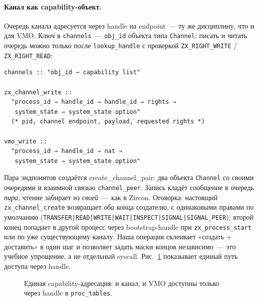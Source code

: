 \documentclass[11pt,a4paper]{article}
\newcommand{\isabel}[1]{{\isabelleit #1}}
\newcommand{\lemmaname}[1]{\isabel{#1}}
\begin{document}
\paragraph{Канал как \textenglish{capability}-объект.}
Очередь канала адресуется через handle на
endpoint~--- ту же дисциплину, что и для VMO. Ключ в
\texttt{channels}~--- \texttt{obj\_id} объекта типа \texttt{Channel};
писать и читать очередь можно только после \texttt{lookup\_handle} с
проверкой \texttt{ZX\_RIGHT\_WRITE} / \texttt{ZX\_RIGHT\_READ}:
\begin{lstlisting}
channels :: "obj_id ⇀ capability list"

zx_channel_write ::
  "process_id ⇒ handle_id ⇒ handle_id ⇒ rights ⇒
   system_state ⇒ system_state option"
  (* pid, channel endpoint, payload, requested rights *)

vmo_write ::
  "process_id ⇒ handle_id ⇒ nat ⇒
   system_state ⇒ system_state option"
\end{lstlisting}
Пара эндпоинтов создаётся \lemmaname{create\_channel\_pair}: два объекта
\texttt{Channel} со своими очередями и взаимной связью
\texttt{channel\_peer}. Запись кладёт сообщение в очередь
\emph{пира}, чтение забирает из \emph{своей}~--- как в Zircon.
Оговорка: настоящий \texttt{zx\_channel\_create} возвращает \emph{оба}
конца создателю, с одинаковыми правами по умолчанию
(\texttt{TRANSFER|READ|WRITE|WAIT|INSPECT|SIGNAL|SIGNAL\_PEER}); второй
конец попадает в другой процесс через bootstrap-handle при
\texttt{zx\_process\_start} или по уже существующему каналу. Наша операция
склеивает «создать + доставить» в один шаг и позволяет задать маски
концов независимо~--- это учебное упрощение, а не отдельный syscall.
Рис.~\ref{fig:channel-handles} показывает единый путь доступа через handle.

\begin{figure}[ht]
	\centering
	\caption{Единая \textenglish{capability}-адресация: и канал, и VMO доступны только через
		handle в \texttt{proc\_tables}.}
	\label{fig:channel-handles}
\end{figure}
\end{document}
